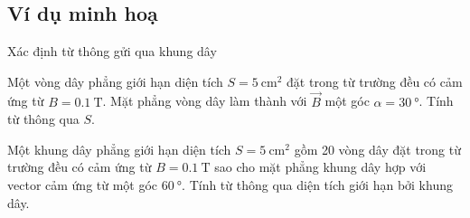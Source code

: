 \subsection{Ví dụ minh hoạ}
\begin{dang}{Xác định từ thông gửi qua khung dây}
	\end{dang}
\begin{vd}
		Một vòng dây phẳng giới hạn diện tích $S=\SI{5}{\centi\meter^2}$ đặt trong từ trường đều có cảm ứng từ $B=\SI{0.1}{\tesla}$. Mặt phẳng vòng dây làm thành với $\vec{B}$ một góc $\alpha=\SI{30}{\degree}$. Tính từ thông qua $S$.
\end{vd}
\begin{vd}
		Một khung dây phẳng giới hạn diện tích $S=\SI{5}{\centi\meter^2}$ gồm 20 vòng dây đặt trong từ trường đều  có cảm ứng từ $B=\SI{0.1}{\tesla}$ sao cho mặt phẳng khung dây hợp với vector cảm ứng từ một góc $\SI{60}{\degree}$. Tính từ thông qua diện tích giới hạn bởi khung dây.
\end{vd}

